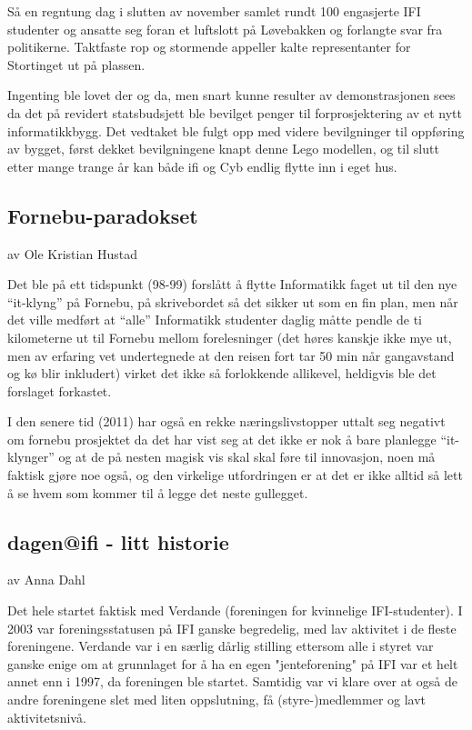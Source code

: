\documentclass[../main.tex]{subfiles}
\begin{document}
Så en regntung dag i slutten av november samlet rundt 100 engasjerte IFI studenter og ansatte seg foran et luftslott på Løvebakken og forlangte svar fra politikerne. Taktfaste rop og stormende appeller kalte representanter for Stortinget ut på plassen.


Ingenting ble lovet der og da, men snart kunne resulter av demonstrasjonen sees da det på revidert statsbudsjett ble bevilget penger til forprosjektering av et nytt informatikkbygg. Det vedtaket ble fulgt opp med videre bevilgninger til oppføring av bygget, først dekket bevilgningene knapt denne Lego modellen, og til slutt etter mange trange år kan både ifi og Cyb endlig flytte inn i eget hus.


\subsection{Fornebu-paradokset}
av Ole Kristian Hustad

Det ble på ett tidspunkt (98-99) forslått å flytte Informatikk faget ut til den nye “it-klyng” på Fornebu, på skrivebordet så det sikker ut som en fin plan, men når det ville medført at “alle” Informatikk studenter daglig måtte pendle de ti kilometerne ut til Fornebu mellom forelesninger (det høres kanskje ikke mye ut, men av erfaring vet undertegnede at den reisen fort tar 50 min når gangavstand og kø blir inkludert) virket det ikke så forlokkende allikevel, heldigvis ble det forslaget forkastet.

I den senere tid (2011)  har også en rekke næringslivstopper uttalt seg negativt om fornebu prosjektet da det har vist seg at det ikke er nok å bare planlegge “it-klynger” og at de på nesten magisk vis skal skal føre til innovasjon, noen må faktisk gjøre noe også, og den virkelige utfordringen er at det er ikke alltid så lett å se hvem som kommer til å legge det neste gullegget.

\subsection{dagen@ifi - litt historie}
av Anna Dahl

Det hele startet faktisk med Verdande (foreningen for kvinnelige IFI-studenter). I 2003 var foreningsstatusen på IFI ganske begredelig, med lav aktivitet i de fleste foreningene. Verdande var i en særlig dårlig stilling ettersom alle i styret var ganske enige om at grunnlaget for å ha en egen "jenteforening" på IFI var et helt annet enn i 1997, da foreningen ble startet. Samtidig var vi klare over at også de andre foreningene slet med liten oppslutning, få (styre-)medlemmer og lavt aktivitetsnivå.
\end{document}

